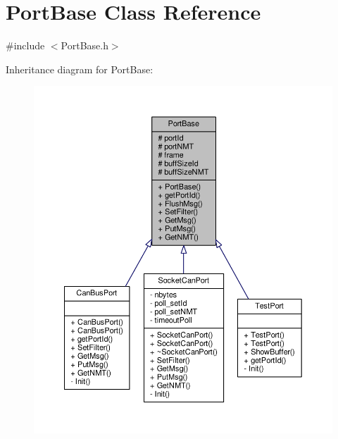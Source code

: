 \hypertarget{classPortBase}{}\section{Port\+Base Class Reference}
\label{classPortBase}


{\ttfamily \#include $<$Port\+Base.\+h$>$}



Inheritance diagram for Port\+Base\+:\nopagebreak
\begin{figure}[H]
\begin{center}
\leavevmode
\includegraphics[width=350pt]{classPortBase__inherit__graph}
\end{center}
\end{figure}


